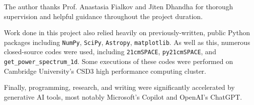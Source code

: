\documentclass[floats,floatfix,showpacs,amssymb,prd,superscriptaddress,nofootinbib]{revtex4-2} %
\newcommand{\code}{\texttt}
\begin{document}
\begin{acknowledgments}
The author thanks Prof. Anastasia Fialkov and Jiten Dhandha for thorough supervision and helpful guidance throughout the project duration. 

Work done in this project also relied heavily on previously-written, public Python packages including \code{NumPy}, \code{SciPy}, \code{Astropy}, \code{matplotlib}. As well as this, numerous closed-source codes were used, including \code{21cmSPACE}, \code{py21cmSPACE}, and \code{get\_power\_spectrum\_1d}. Some executions of these codes were performed on Cambridge University's CSD3 high performance computing cluster.

Finally, programming, research, and writing were significantly accelerated by generative AI tools, most notably Microsoft's Copilot and OpenAI's ChatGPT. 
\end{acknowledgments}



\end{document}
